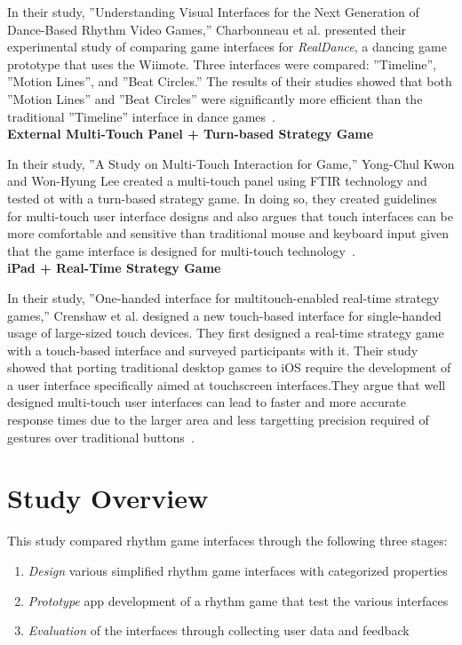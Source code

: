 \documentclass{sig-alternate}
\begin{document}
In their study, ''Understanding Visual Interfaces for the Next Generation of Dance-Based Rhythm Video Games,'' Charbonneau et al. presented their experimental study of comparing game interfaces for \textit{RealDance}, a dancing game prototype that uses the Wiimote. Three interfaces were compared: ''Timeline'', ''Motion Lines'', and ''Beat Circles.'' The results of their studies showed that both ''Motion Lines'' and ''Beat Circles'' were significantly more efficient than the traditional ''Timeline'' interface in dance games~\cite{realdance}.\\

\noindent \textbf{External Multi-Touch Panel + Turn-based Strategy Game}

In their study, ''A Study on Multi-Touch Interaction for Game,'' Yong-Chul Kwon and Won-Hyung Lee created a multi-touch panel using FTIR technology and tested ot with a turn-based strategy game. In doing so, they created guidelines for multi-touch user interface designs and also argues that touch interfaces can be more comfortable and sensitive than traditional mouse and keyboard input given that the game interface is designed for multi-touch technology~\cite{tbs_game}. \\

\noindent \textbf{iPad + Real-Time Strategy Game}

In their study, ''One-handed interface for multitouch-enabled real-time strategy games,'' Crenshaw et al. designed a new touch-based interface for single-handed usage of large-sized touch devices. They first designed a real-time strategy game with a touch-based interface and surveyed participants with it. Their study showed that porting traditional desktop games to iOS require the development of a user interface specifically aimed at touchscreen interfaces.They argue that well designed multi-touch user interfaces can lead to faster and more accurate response times due to the larger area and less targetting precision required of gestures over traditional buttons~\cite{rts_game}.

\section{Study Overview}
\label{sec:study_overview}

This study compared rhythm game interfaces through the following three stages:
\begin{enumerate}
	\item \textit{Design} various simplified rhythm game interfaces with categorized properties\vspace{-3pt}
	\item \textit{Prototype} app development of a rhythm game that test the various interfaces\vspace{-3pt}
	\item \textit{Evaluation} of the interfaces through collecting user data and feedback\vspace{-3pt}
\end{enumerate}
\end{document}
